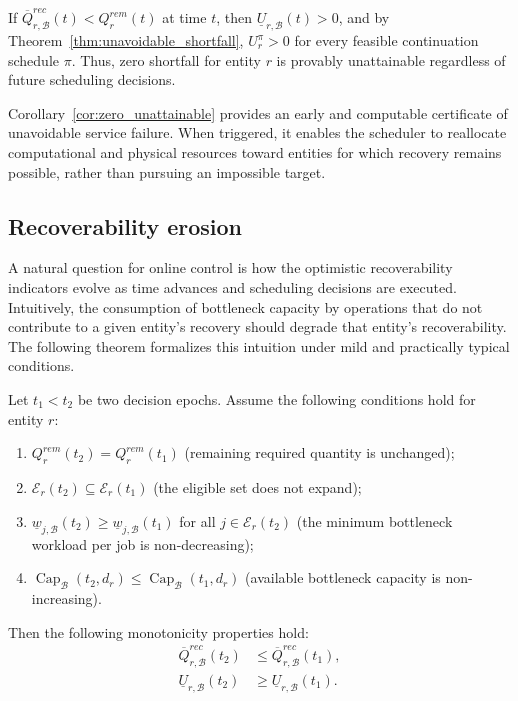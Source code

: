 \begin{corollary}\label{cor:zero_unattainable}
If $\overline Q_{r,\mathcal B}^{rec}(t)<Q_r^{rem}(t)$ at time $t$, then $\underline U_{r,\mathcal B}(t)>0$, and by Theorem~\ref{thm:unavoidable_shortfall}, $U_r^\pi>0$ for every feasible continuation schedule $\pi$. Thus, zero shortfall for entity $r$ is provably unattainable regardless of future scheduling decisions.
\end{corollary}

Corollary~\ref{cor:zero_unattainable} provides an early and computable certificate of unavoidable service failure. When triggered, it enables the scheduler to reallocate computational and physical resources toward entities for which recovery remains possible, rather than pursuing an impossible target.

\subsection{Recoverability erosion}
\label{sec:recoverability_erosion}

A natural question for online control is how the optimistic recoverability indicators evolve as time advances and scheduling decisions are executed. Intuitively, the consumption of bottleneck capacity by operations that do not contribute to a given entity's recovery should degrade that entity's recoverability. The following theorem formalizes this intuition under mild and practically typical conditions.

\begin{theorem}\label{thm:erosion}
Let $t_1<t_2$ be two decision epochs. Assume the following conditions hold for entity $r$:
\begin{enumerate}
    \item[(C1)] $Q_r^{rem}(t_2)=Q_r^{rem}(t_1)$ (remaining required quantity is unchanged);
    \item[(C2)] $\mathcal E_r(t_2)\subseteq\mathcal E_r(t_1)$ (the eligible set does not expand);
    \item[(C3)] $\underline w_{j,\mathcal B}(t_2)\ge\underline w_{j,\mathcal B}(t_1)$ for all $j\in\mathcal E_r(t_2)$ (the minimum bottleneck workload per job is non-decreasing);
    \item[(C4)] $\operatorname{Cap}_{\mathcal B}(t_2,d_r)\le\operatorname{Cap}_{\mathcal B}(t_1,d_r)$ (available bottleneck capacity is non-increasing).
\end{enumerate}
Then the following monotonicity properties hold:
\begin{align}
\overline Q_{r,\mathcal B}^{rec}(t_2)&\le\overline Q_{r,\mathcal B}^{rec}(t_1),\label{eq:erosion_q}\\
\underline U_{r,\mathcal B}(t_2)&\ge\underline U_{r,\mathcal B}(t_1).\label{eq:erosion_u}
\end{align}
\end{theorem}

